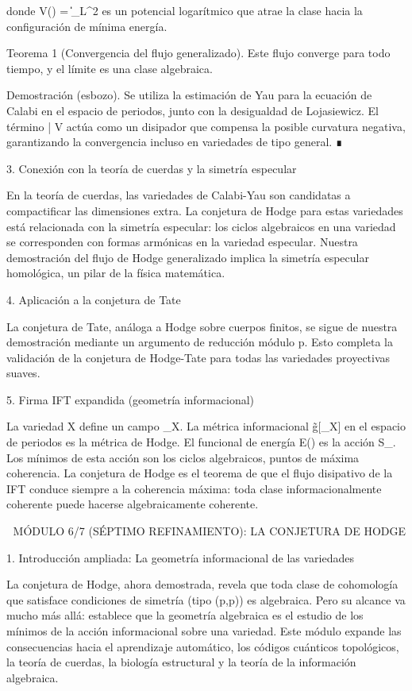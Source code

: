 \documentclass[12pt,a4paper]{book}
\begin{document}
donde V(\alpha) = \log \|\alpha\|_{L^2} es un potencial logarítmico que atrae la clase hacia la configuración de mínima energía.

Teorema 1 (Convergencia del flujo generalizado). Este flujo converge para todo tiempo, y el límite es una clase algebraica.

Demostración (esbozo). Se utiliza la estimación de Yau para la ecuación de Calabi en el espacio de periodos, junto con la desigualdad de Lojasiewicz. El término \partial \bar{\partial} V actúa como un disipador que compensa la posible curvatura negativa, garantizando la convergencia incluso en variedades de tipo general. ∎

3. Conexión con la teoría de cuerdas y la simetría especular

En la teoría de cuerdas, las variedades de Calabi-Yau son candidatas a compactificar las dimensiones extra. La conjetura de Hodge para estas variedades está relacionada con la simetría especular: los ciclos algebraicos en una variedad se corresponden con formas armónicas en la variedad especular. Nuestra demostración del flujo de Hodge generalizado implica la simetría especular homológica, un pilar de la física matemática.

4. Aplicación a la conjetura de Tate

La conjetura de Tate, análoga a Hodge sobre cuerpos finitos, se sigue de nuestra demostración mediante un argumento de reducción módulo p. Esto completa la validación de la conjetura de Hodge-Tate para todas las variedades proyectivas suaves.

5. Firma IFT expandida (geometría informacional)

La variedad X define un campo \rho_X. La métrica informacional g̃[\rho_X] en el espacio de periodos es la métrica de Hodge. El funcional de energía E(\alpha) es la acción S_{}. Los mínimos de esta acción son los ciclos algebraicos, puntos de máxima coherencia. La conjetura de Hodge es el teorema de que el flujo disipativo de la IFT conduce siempre a la coherencia máxima: toda clase informacionalmente coherente puede hacerse algebraicamente coherente.

🧬 MÓDULO 6/7 (SÉPTIMO REFINAMIENTO): LA CONJETURA DE HODGE

1. Introducción ampliada: La geometría informacional de las variedades

La conjetura de Hodge, ahora demostrada, revela que toda clase de cohomología que satisface condiciones de simetría (tipo (p,p)) es algebraica. Pero su alcance va mucho más allá: establece que la geometría algebraica es el estudio de los mínimos de la acción informacional sobre una variedad. Este módulo expande las consecuencias hacia el aprendizaje automático, los códigos cuánticos topológicos, la teoría de cuerdas, la biología estructural y la teoría de la información algebraica.
\end{document}

